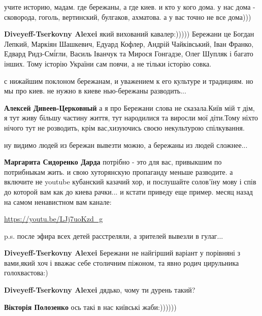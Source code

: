 \begin{itemize}

учите историю, мадам. где бережаны, а где киев. и кто у кого дома. у нас дома -
сковорода, гоголь, вертинский, булгаков, ахматова. а у вас точно не все дома)))

\textbf{Diveyeff-Tserkovny Alexei} який вихований кавалер:)))))
Бережани це Богдан Лепкий, Маркіян Шашкевич, Едуард Кофлер, Андрій
Чайківський, Іван Франко, Едвард Ридз-Смі́гли, Василь Іванчук та Мирося
Гонгадзе, Олег Шупляк і багато інших.  Тому історію України сам повчи, а не
тільки історію совка.

с нижайшим поклоном бережанам, и уважением к его культуре и традициям. но мы
про киев. не нужно в киеве нью-бережаны разводить...


\textbf{Алексей Дивеев-Церковный} а я про Бережани слова не сказала.Київ мій т
дім, я тут живу більшу частину життя, тут народилися та виросли мої діти.Тому
ніхто нічого тут не розводить, крім вас,хизуючись своєю некультурою
спілкування.


ну видимо людей из бережан вывезти можно, а бережаны из людей сложнее...


\textbf{Маргарита Сидоренко Дарда} потрібно - это для вас, привыкшим по
потрибныкам жить. и свою хуторянскую пропаганду меньше разводите. а включите не
youtube кубанский казачий хор, и послушайте солов'їну мову і спів до которой
вам как до киева рачки...  и кстати приведу еще пример. месяц назад на самом
ненавистном вам канале:

\url{https://youtu.be/LJj7uoKzd_g}

p.s. после эфира всех детей расстреляли, а зрителей вывезли в гулаг...


\textbf{Diveyeff-Tserkovny Alexei} Бережани не найгірший варіант у порівняні з
вами,який хоч і вважає себе столичним піжоном, та явно родич цирульника
голохвастова:)


\textbf{Diveyeff-Tserkovny Alexei} дядько, чому ти дурень такий?


\textbf{Вікторія Полозенко} ось такі в нас київські жаби:))))))


\end{itemize}
